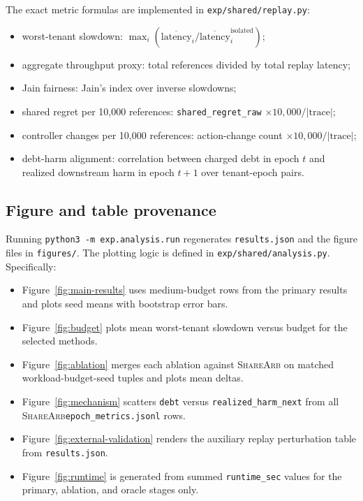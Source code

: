 \documentclass{article}
\newcommand{\sharearb}{\textsc{ShareArb}\xspace}
\begin{document}
The exact metric formulas are implemented in \texttt{exp/shared/replay.py}:
\begin{itemize}[leftmargin=1.5em]
  \item worst-tenant slowdown: $\max_i \left(\overline{\mathrm{latency}}_i / \overline{\mathrm{latency}}^{\mathrm{isolated}}_i\right)$;
  \item aggregate throughput proxy: total references divided by total replay latency;
  \item Jain fairness: Jain's index over inverse slowdowns;
  \item shared regret per 10{,}000 references: \texttt{shared\_regret\_raw} $\times 10{,}000 / |\mathrm{trace}|$;
  \item controller changes per 10{,}000 references: action-change count $\times 10{,}000 / |\mathrm{trace}|$;
  \item debt-harm alignment: correlation between charged debt in epoch $t$ and realized downstream harm in epoch $t+1$ over tenant-epoch pairs.
\end{itemize}

\subsection{Figure and table provenance}

Running \texttt{python3 -m exp.analysis.run} regenerates \texttt{results.json} and the figure files in \texttt{figures/}. The plotting logic is defined in \texttt{exp/shared/analysis.py}. Specifically:
\begin{itemize}[leftmargin=1.5em]
  \item Figure~\ref{fig:main-results} uses medium-budget rows from the primary results and plots seed means with bootstrap error bars.
  \item Figure~\ref{fig:budget} plots mean worst-tenant slowdown versus budget for the selected methods.
  \item Figure~\ref{fig:ablation} merges each ablation against \sharearb on matched workload-budget-seed tuples and plots mean deltas.
  \item Figure~\ref{fig:mechanism} scatters \texttt{debt} versus \texttt{realized\_harm\_next} from all \sharearb \texttt{epoch\_metrics.jsonl} rows.
  \item Figure~\ref{fig:external-validation} renders the auxiliary replay perturbation table from \texttt{results.json}.
  \item Figure~\ref{fig:runtime} is generated from summed \texttt{runtime\_sec} values for the primary, ablation, and oracle stages only.
\end{itemize}
\end{document}
